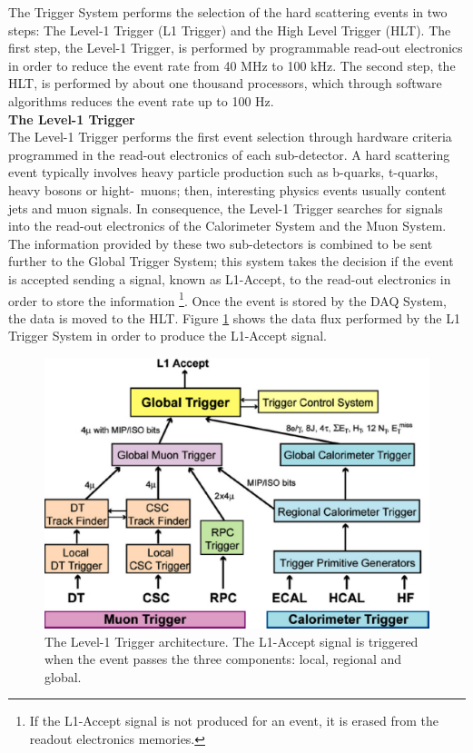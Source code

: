 \noindent The Trigger System performs the selection of the hard scattering events in two steps:
The Level-1 Trigger (L1 Trigger) and the High Level Trigger (HLT). The first step, the Level-1 Trigger,
is performed by programmable read-out electronics in order to reduce the event rate from 40 MHz 
to 100 kHz. The second step, the HLT, is performed by about one thousand processors, which through
software algorithms reduces the event rate up to 100 Hz. \\

\textbf{The Level-1 Trigger}\\

\noindent The Level-1 Trigger performs the first event selection through hardware criteria programmed 
in the read-out electronics of each sub-detector. A hard scattering event typically 
involves heavy particle production such as b-quarks, t-quarks, heavy bosons 
or hight-\pt~muons; then, interesting physics events usually content jets and muon signals. In 
consequence, the Level-1 Trigger searches for signals into the read-out electronics 
of the Calorimeter System and the Muon System. The information provided by these two sub-detectors
is combined to be sent further to the Global Trigger System; this system takes the decision
if the event is accepted sending a signal, known as L1-Accept, to the read-out electronics 
in order to store the information \footnote[1]{If the L1-Accept signal is not produced for an event, it is erased from the 
readout electronics memories.}. Once the event is stored by the DAQ System, the data is moved 
to the HLT. Figure \ref{figchp2:TriggerSystem} shows the data flux performed by the L1 Trigger System
in order to produce the L1-Accept signal. \\

\begin{center}
\begin{figure}[h]
\centering
\includegraphics[scale=0.35]{figuras/Chapter2/trigger}
\caption{The Level-1 Trigger architecture. The L1-Accept signal is triggered when 
the event passes the three components: local, regional and global.}\label{figchp2:TriggerSystem}
\end{figure}
\end{center}

